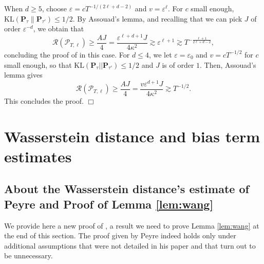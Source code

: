 \documentclass[10pt,a4paper]{article}
\renewcommand{\P}{{\mathbf P}}
\newcommand{\cR}{{\mathcal R}}
\newcommand\cP{\mathcal{P}}
\newcommand{\eps}{{\varepsilon}}
\renewcommand{\theequation}{\arabic{section}.\arabic{equation}}
\let \ssection=\section
\renewcommand{\section}{\setcounter{equation}{0}\ssection}
\begin{document}
When $d\ge 5$, choose $\eps= cT^{-1/(2\ell+d-2)}$ and $v=\eps^\ell$. For $c$ small enough, $\mathrm{KL}(\P_{\tau}\|\P_{\tau'})\le 1/2$.
 By Assouad's lemma, and recalling that we can pick $J$ of order $\eps^{-d}$, we obtain that
 \begin{equation}
      \cR(\cP_{T,\ell})\ge \frac{AJ}{4} = \frac{\eps^{\ell+d+1}J}{4\kappa^2} \gtrsim \eps^{\ell+1}\gtrsim T^{-\frac{\ell+1}{2\ell+d-2}},
 \end{equation}
concluding the proof of  in this case. For $d\le 4$, we let $\eps=   {\eps_0}$ and $v=cT^{-1/2}$ for $c$ small enough, so that $\mathrm{KL}(\P_{\tau} || \P_{\tau'} )\le 1/2$ and $J$ is of order $1$. Then, Assouad's lemma gives
 \begin{equation}
      \cR(\cP_{T,\ell})\ge \frac{AJ}{4} = \frac{v \eps^{d+1}J}{4\kappa^2} \gtrsim T^{-1/2}.
 \end{equation}
This concludes the proof. \hfill $\Box$
\appendix 
\renewcommand{\theequation}{\Alph{section}.\arabic{equation}}
\let \sappend=\section
\renewcommand{\section}{\setcounter{equation}{0}\sappend}

\section{Wasserstein distance and bias term estimates}
\subsection{About the Wasserstein distance's estimate of Peyre and Proof of Lemma \ref{lem:wang}}\label{appendix:peyre estimate}


We provide here a new proof of \cite[Theorem 2.1]{peyre2018comparison}, a result we need to prove Lemma \ref{lem:wang} at the end of this section. The proof given by Peyre indeed holds only under additional assumptions that were not detailed in his paper and that turn out to be unnecessary.
\end{document}
